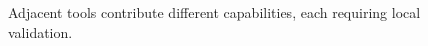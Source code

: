 \begin{figure}[H]
\centering
{}
\caption{Adjacent tools contribute different capabilities, each requiring local validation.}\label{fig:teach-P-04-prototype-03}
\end{figure}
